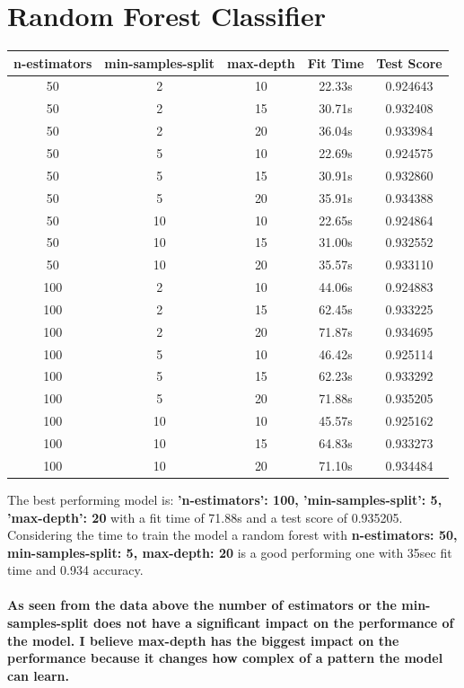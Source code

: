 \documentclass{article}
\begin{document}
\section{Random Forest Classifier}
\begin{tabular}{|c c c | c c|}
\hline
n-estimators & min-samples-split & max-depth & Fit Time & Test Score \\ [0.5ex] 
\hline
50 & 2 & 10 & 22.33s & 0.924643 \\
50 & 2 & 15 & 30.71s & 0.932408 \\
50 & 2 & 20 & 36.04s & 0.933984 \\ 
\hline
50 & 5 & 10 & 22.69s & 0.924575 \\
50 & 5 & 15 & 30.91s & 0.932860 \\
\rowcolor{LightYellow}
50 & 5 & 20 & 35.91s & 0.934388 \\ 
\hline
50 & 10 & 10 & 22.65s & 0.924864 \\
50 & 10 & 15 & 31.00s & 0.932552 \\
50 & 10 & 20 & 35.57s & 0.933110 \\ 
\hline
\hline
100 & 2 & 10 & 44.06s & 0.924883 \\
100 & 2 & 15 & 62.45s & 0.933225 \\
100 & 2 & 20 & 71.87s & 0.934695 \\ 
\hline
100 & 5 & 10 & 46.42s & 0.925114 \\
100 & 5 & 15 & 62.23s & 0.933292 \\
\rowcolor{LightYellow}
100 & 5 & 20 & 71.88s & 0.935205 \\ 
\hline
100 & 10 & 10 & 45.57s & 0.925162 \\
100 & 10 & 15 & 64.83s & 0.933273 \\
100 & 10 & 20 & 71.10s & 0.934484 \\
\hline
\end{tabular}

The best performing model is: \textbf{'n-estimators': 100, 'min-samples-split': 5, 'max-depth': 20} with a fit time of 71.88s and a test score of 0.935205.
\\ Considering the time to train the model a random forest with \textbf{n-estimators: 50, min-samples-split: 5, max-depth: 20} is a good performing one with 35sec fit time and 0.934 accuracy.

\paragraph[Comment]{
As seen from the data above the number of estimators or the min-samples-split does not have a significant impact on the performance of the model.
I believe max-depth has the biggest impact on the performance because it changes how complex of a pattern the model can learn.
}
\end{document}
